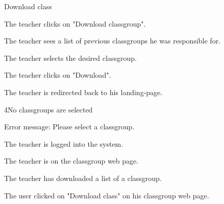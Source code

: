\begin{uc}{Download class}

    \begin{uc-mss}
    \item The teacher clicks on "Download classgroup".
    \item The teacher sees a list of previous classgroups he was responsible for.
    \item The teacher selects the desired classgroup.
    \item The teacher clicks on "Download".
    \item The teacher is redirected back to his landing-page.
    \end{uc-mss}

    \begin{uc-ext}

        \begin{uc-fail}{4}{No classgroups are selected}
        \item Error message: Please select a classgroup.
        \end{uc-fail}

    \end{uc-ext}

    \begin{uc-pre}
    \item The teacher is logged into the system.
    \item The teacher is on the classgroup web page.
    \end{uc-pre}

    \begin{uc-post}
    \item The teacher has downloaded a list of a classgroup.
    \end{uc-post}

    \begin{uc-trig}
        The user clicked on "Download class" on his classgroup web page.
    \end{uc-trig}

\end{uc}
